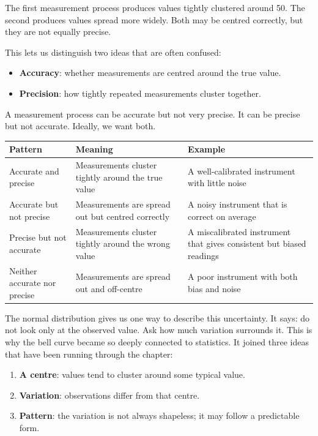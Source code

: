 \documentclass[
  letterpaper,
  DIV=11,
  numbers=noendperiod]{scrreprt}
\providecommand{\tightlist}{%
  \setlength{\itemsep}{0pt}\setlength{\parskip}{0pt}}
\begin{document}
The first measurement process produces values tightly clustered around
50. The second produces values spread more widely. Both may be centred
correctly, but they are not equally precise.

This lets us distinguish two ideas that are often confused:

\begin{itemize}
\tightlist
\item
  \textbf{Accuracy}: whether measurements are centred around the true
  value.
\item
  \textbf{Precision}: how tightly repeated measurements cluster
  together.
\end{itemize}

A measurement process can be accurate but not very precise. It can be
precise but not accurate. Ideally, we want both.

\begin{table}
\fontsize{12.0pt}{14.0pt}\selectfont
\begin{tabular*}{\linewidth}{@{\extracolsep{\fill}}lll}
\toprule
Pattern & Meaning & Example \\ 
\midrule\addlinespace[2.5pt]
Accurate and precise & Measurements cluster tightly around the true value & A well-calibrated instrument with little noise \\ 
Accurate but not precise & Measurements are spread out but centred correctly & A noisy instrument that is correct on average \\ 
Precise but not accurate & Measurements cluster tightly around the wrong value & A miscalibrated instrument that gives consistent but biased readings \\ 
Neither accurate nor precise & Measurements are spread out and off-centre & A poor instrument with both bias and noise \\ 
\bottomrule
\end{tabular*}
\end{table}

The normal distribution gives us one way to describe this uncertainty.
It says: do not look only at the observed value. Ask how much variation
surrounds it. This is why the bell curve became so deeply connected to
statistics. It joined three ideas that have been running through the
chapter:

\begin{enumerate}
\def\labelenumi{\arabic{enumi}.}
\tightlist
\item
  \textbf{A centre}: values tend to cluster around some typical value.
\item
  \textbf{Variation}: observations differ from that centre.
\item
  \textbf{Pattern}: the variation is not always shapeless; it may follow
  a predictable form.
\end{enumerate}
\end{document}
